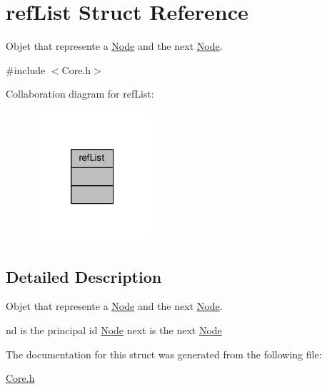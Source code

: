 \hypertarget{structrefList}{\section{ref\-List Struct Reference}
\label{structrefList}
}


Objet that represente a \hyperlink{structNode}{Node} and the next \hyperlink{structNode}{Node}.  




{\ttfamily \#include $<$Core.\-h$>$}



Collaboration diagram for ref\-List\-:
\nopagebreak
\begin{figure}[H]
\begin{center}
\leavevmode
\includegraphics[width=122pt]{structrefList__coll__graph}
\end{center}
\end{figure}


\subsection{Detailed Description}
Objet that represente a \hyperlink{structNode}{Node} and the next \hyperlink{structNode}{Node}. 

nd is the principal id \hyperlink{structNode}{Node} next is the next \hyperlink{structNode}{Node} 

The documentation for this struct was generated from the following file\-:\begin{DoxyCompactItemize}
\item 
\hyperlink{Core_8h}{Core.\-h}\end{DoxyCompactItemize}
